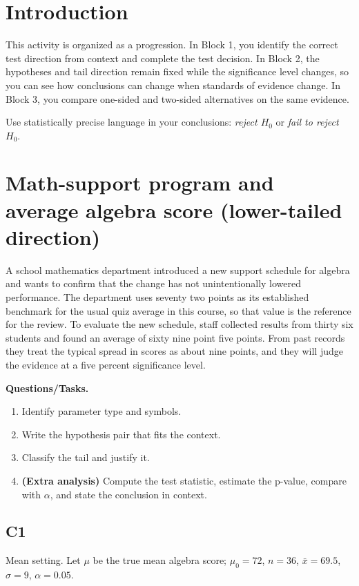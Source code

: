 \section{Introduction}
This activity is organized as a progression. In Block 1, you identify the correct test direction from context and complete the test decision. In Block 2, the hypotheses and tail direction remain fixed while the significance level changes, so you can see how conclusions can change when standards of evidence change. In Block 3, you compare one-sided and two-sided alternatives on the same evidence.

Use statistically precise language in your conclusions: \emph{reject \(H_0\)} or \emph{fail to reject \(H_0\)}.

\section{Math-support program and average algebra score (lower-tailed direction)}
A school mathematics department introduced a new support schedule for algebra and wants to confirm that the change has not unintentionally lowered performance. The department uses seventy two points as its established benchmark for the usual quiz average in this course, so that value is the reference for the review. To evaluate the new schedule, staff collected results from thirty six students and found an average of sixty nine point five points. From past records they treat the typical spread in scores as about nine points, and they will judge the evidence at a five percent significance level.

\textbf{Questions/Tasks.}
\begin{enumerate}
    \item[(C1)] Identify parameter type and symbols.
    \item[(C2)] Write the hypothesis pair that fits the context.
    \item[(C3)] Classify the tail and justify it.
    \item[(EA)] \textbf{(Extra analysis)} Compute the test statistic, estimate the p-value, compare with \(\alpha\), and state the conclusion in context.
\end{enumerate}

\subsection*{C1}
Mean setting. Let \(\mu\) be the true mean algebra score; \(\mu_0=72\), \(n=36\), \(\bar{x}=69.5\), \(\sigma=9\), \(\alpha=0.05\).


